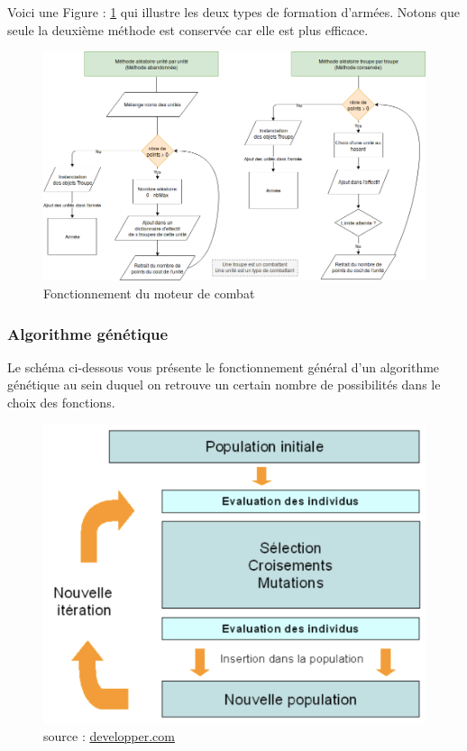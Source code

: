 \documentclass[a4paper]{article} %
\begin{document}
Voici une Figure : \ref{fig:DiagrammeAleatoire} qui illustre les deux types de formation d'armées. Notons que seule la deuxième méthode est conservée car elle est plus efficace.
\begin{figure}[!h]
	\begin{center}
	\includegraphics[width=14cm]{Images/creation-armee.png} 
	\caption{Fonctionnement du moteur de combat\label{fig:DiagrammeAleatoire}}
	\end{center}
\end{figure}

		\subsubsection{Algorithme génétique}\label{AlgoGen}
Le schéma ci-dessous vous présente le fonctionnement général d'un algorithme génétique au sein duquel on retrouve un certain nombre de possibilités dans le choix des fonctions.

\begin{figure}[!h]
	\begin{center}
	\includegraphics[scale= 0.4]{Images/algoGenet.png}
	\caption{source : \href{https://khayyam.developpez.com/articles/algo/genetic/\#L3.3}{developper.com}}
	\end{center}
\end{figure}
\end{document}
